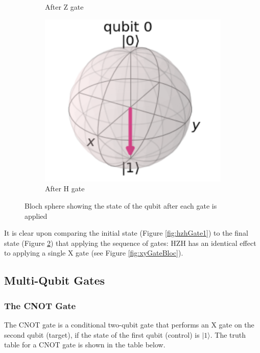 \begin{figure}[h]
\begin{subfigure}[h]{0.24\textwidth}
        \caption{After Z gate}
        \label{fig:hzhGate3}
    \end{subfigure}
        \begin{subfigure}[h]{0.24\textwidth}
        \centering
        \includegraphics[width=\textwidth]{lab2/images/hzhGate4.png}
        \caption{After H gate}
        \label{fig:hzhGate4}
    \end{subfigure}
    \caption{Bloch sphere showing the state of the qubit after each gate is applied} 
    \label{fig:bSphereHZHGate}
\end{figure}

It is clear upon comparing the initial state (Figure \ref{fig:hzhGate1}) to the final state (Figure \ref{fig:hzhGate4}) that applying the sequence of gates: HZH has an identical effect to applying a single X gate (see Figure \ref{fig:xyGateBloc}).

\subsection{Multi-Qubit Gates}

\subsubsection{The CNOT Gate}
The CNOT gate is a conditional two-qubit gate that performs an X gate on the second qubit (target), if the state of the first qubit (control) is  $|1\rangle$. The truth table for a CNOT gate is shown in the table below.

